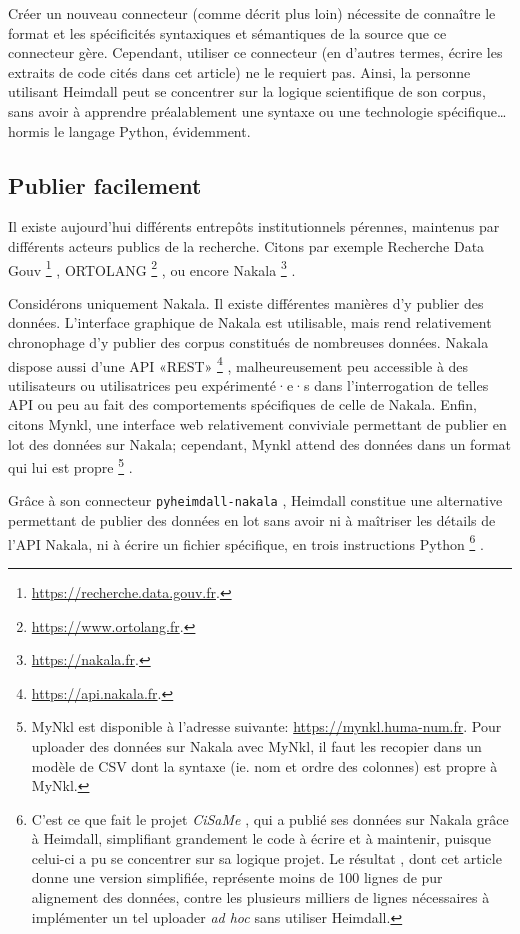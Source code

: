 \documentclass[final,fra]{anthology-ch}         %
\begin{document}
Créer un nouveau connecteur (comme décrit plus loin) nécessite de connaître le format et les spécificités syntaxiques et sémantiques de la source que ce connecteur gère. Cependant, utiliser ce connecteur (en d'autres termes, écrire les extraits de code cités dans cet article) ne le requiert pas. Ainsi, la personne utilisant Heimdall peut se concentrer sur la logique scientifique de son corpus, sans avoir à apprendre préalablement une syntaxe ou une technologie spécifique\ldots{} hormis le langage Python, évidemment.

\subsection{Publier facilement}\label{publier-facilement}

Il existe aujourd'hui différents entrepôts institutionnels pérennes, maintenus par différents acteurs publics de la recherche. Citons par exemple Recherche Data Gouv%
    \footnote{\url{https://recherche.data.gouv.fr}.}%
,
ORTOLANG%
    \footnote{\url{https://www.ortolang.fr}.}%
, ou encore Nakala%
    \footnote{\url{https://nakala.fr}.}%
.

Considérons uniquement Nakala. Il existe différentes manières d'y publier des données. L'interface graphique de Nakala est utilisable, mais rend relativement chronophage d'y publier des corpus constitués de nombreuses données. Nakala dispose aussi d'une API «REST»
    \footnote{\url{https://api.nakala.fr}.}%
, malheureusement peu accessible à des utilisateurs ou utilisatrices peu expérimenté·e·s dans l'interrogation de telles API ou peu au fait des comportements spécifiques de celle de Nakala. Enfin, citons Mynkl, une interface web relativement conviviale permettant de publier en lot des données sur Nakala; cependant, Mynkl attend des données dans un format qui lui est propre%
    \footnote{MyNkl est disponible à l’adresse suivante: \url{https://mynkl.huma-num.fr}. Pour uploader des données sur Nakala avec MyNkl, il faut les recopier dans un modèle de CSV dont la syntaxe (ie. nom et ordre des colonnes) est propre à MyNkl.}%
.

Grâce à son connecteur \texttt{pyheimdall-nakala}
\autocite{pyheimdall-nakala}, Heimdall constitue une alternative permettant de publier des données en lot sans avoir ni à maîtriser les détails de l'API Nakala, ni à écrire un fichier spécifique, en trois instructions Python
    \footnote{C'est ce que fait le projet \emph{CiSaMe}   \autocite{cisame}, qui a publié ses données sur Nakala grâce à   Heimdall, simplifiant grandement le code à écrire et à maintenir,   puisque celui-ci a pu se concentrer sur sa logique projet. Le résultat \autocite{cisame:uploader}, dont cet article donne une version simplifiée, représente moins de 100 lignes de pur alignement des données, contre les plusieurs milliers de lignes nécessaires à implémenter un tel uploader \emph{ad hoc} sans utiliser Heimdall.}%
.
\end{document}

